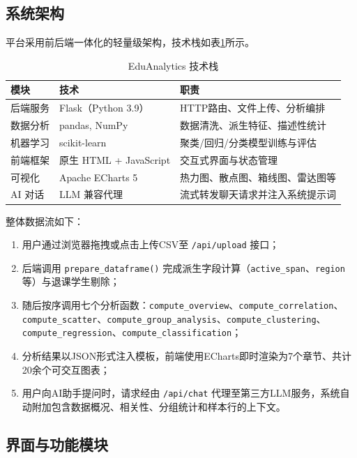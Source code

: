 \documentclass[UTF8, 12pt, a4paper]{ctexart}
\begin{document}
\subsection{系统架构}

平台采用前后端一体化的轻量级架构，技术栈如表\ref{tab:stack}所示。
\begin{table}[H]
\centering
\caption{EduAnalytics 技术栈}
\label{tab:stack}
\begin{tabular}{lll}
\toprule
\textbf{模块} & \textbf{技术} & \textbf{职责} \\
\midrule
后端服务        & Flask（Python 3.9） & HTTP路由、文件上传、分析编排 \\
数据分析        & pandas, NumPy       & 数据清洗、派生特征、描述性统计 \\
机器学习        & scikit-learn        & 聚类/回归/分类模型训练与评估 \\
前端框架        & 原生 HTML + JavaScript & 交互式界面与状态管理 \\
可视化          & Apache ECharts 5    & 热力图、散点图、箱线图、雷达图等 \\
AI 对话         & LLM 兼容代理         & 流式转发聊天请求并注入系统提示词 \\
\bottomrule
\end{tabular}
\end{table}

整体数据流如下：
\begin{enumerate}
    \item 用户通过浏览器拖拽或点击上传CSV至 \texttt{/api/upload} 接口；
    \item 后端调用 \texttt{prepare\_dataframe()} 完成派生字段计算（\texttt{active\_span}、\texttt{region}等）与退课学生剔除；
    \item 随后按序调用七个分析函数：\texttt{compute\_overview}、\texttt{compute\_correlation}、\texttt{compute\_scatter}、\texttt{compute\_group\_analysis}、\texttt{compute\_clustering}、\texttt{compute\_regression}、\texttt{compute\_classification}；
    \item 分析结果以JSON形式注入模板，前端使用ECharts即时渲染为7个章节、共计20余个可交互图表；
    \item 用户向AI助手提问时，请求经由 \texttt{/api/chat} 代理至第三方LLM服务，系统自动附加包含数据概况、相关性、分组统计和样本行的上下文。
\end{enumerate}

\subsection{界面与功能模块}
\end{document}
